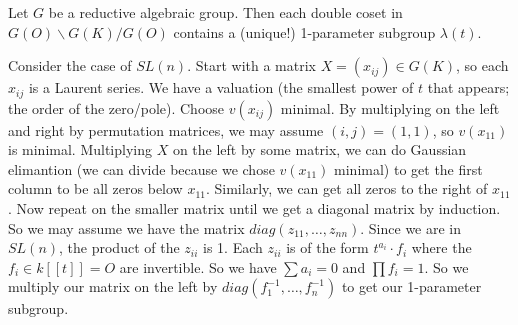 \begin{theorem}[Iwahori]
 Let $G$ be a reductive algebraic group. Then each double coset in $G(O)\backslash G(K)/G(O)$ contains a (unique!) 1-parameter subgroup $\lambda(t)$.
\end{theorem}
Consider the case of $SL(n)$. Start with a matrix $X=(x_{ij})\in G(K)$, so each $x_{ij}$ is a Laurent series. We have a valuation (the smallest power of $t$ that appears; the order of the zero/pole). Choose $v(x_{ij})$ minimal. By multiplying on the left and right by permutation matrices, we may assume $(i,j)=(1,1)$, so $v(x_{11})$ is minimal. Multiplying $X$ on the left by some matrix, we can do Gaussian elimantion (we can divide because we chose $v(x_{11})$ minimal) to get the first column to be all zeros below $x_{11}$. Similarly, we can get all zeros to the right of $x_{11}$. Now repeat on the smaller matrix until we get a diagonal matrix by induction. So we may assume we have the matrix $diag(z_{11},\dots, z_{nn})$. Since we are in $SL(n)$, the product of the $z_{ii}$ is 1. Each $z_{ii}$ is of the form $t^{a_i}\cdot f_i$ where the $f_i\in k[\![t]\!]=O$ are invertible. So we have $\sum a_i=0$ and $\prod f_i=1$. So we multiply our matrix on the left by $diag(f_1^{-1},\dots, f_n^{-1})$ to get our 1-parameter subgroup.
